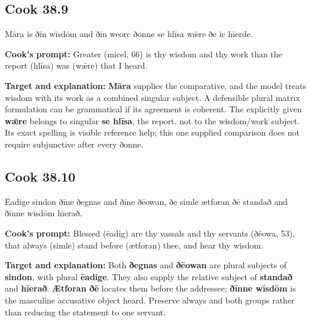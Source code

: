 \par\begin{minipage}{\linewidth}\raggedright
\subsection*{Cook 38.9}

Māra is ðīn wīsdōm and ðīn weorc ðonne se hlīsa wǣre ðe ic hīerde.

\textbf{Cook's prompt:} Greater (micel, 66) is thy wisdom and thy work than the report (hlīsa) was (wǣre) that I heard.

\textbf{Target and explanation:} \textbf{Māra} supplies the comparative, and the model treats wisdom with its work as a combined singular subject. A defensible plural matrix formulation can be grammatical if its agreement is coherent. The explicitly given \textbf{wǣre} belongs to singular \textbf{se hlīsa}, the report, not to the wisdom/\allowbreak{}work subject. Its exact spelling is visible reference help; this one supplied comparison does not require subjunctive after every ðonne.

\end{minipage}\par\addvspace{4pt}

\par\begin{minipage}{\linewidth}\raggedright
\subsection*{Cook 38.10}

Ēadige sindon ðīne ðegnas and ðīne ðēowan, ðe simle ætforan ðē standað and ðīnne wīsdōm hīerað.

\textbf{Cook's prompt:} Blessed (ēadig) are thy vassals and thy servants (ðēowa, 53), that always (simle) stand before (ætforan) thee, and hear thy wisdom.

\textbf{Target and explanation:} Both \textbf{ðegnas} and \textbf{ðēowan} are plural subjects of \textbf{sindon}, with plural \textbf{ēadige}. They also supply the relative subject of \textbf{standað} and \textbf{hīerað}. \textbf{Ætforan ðē} locates them before the addressee; \textbf{ðīnne wīsdōm} is the masculine accusative object heard. Preserve always and both groups rather than reducing the statement to one servant.

\end{minipage}\par\addvspace{4pt}

